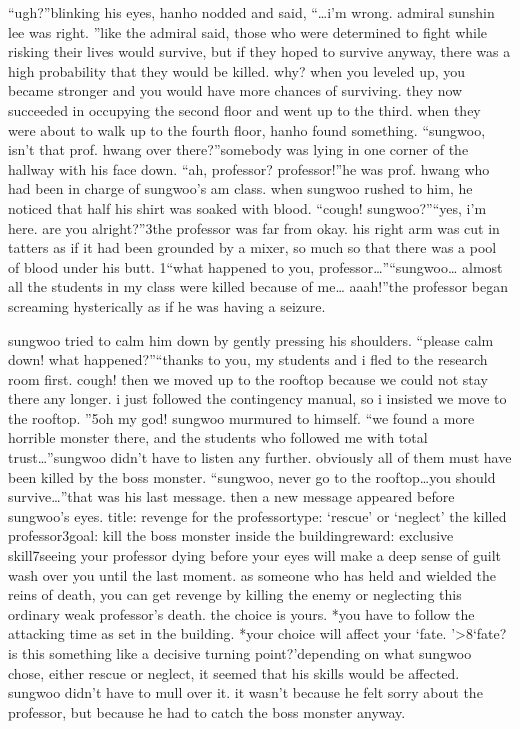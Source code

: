 “ugh?”blinking his eyes, hanho nodded and said, “…i’m wrong.
 admiral sunshin lee was right.
”like the admiral said, those who were determined to fight while risking their lives would survive, but if they hoped to survive anyway, there was a high probability that they would be killed.
why? when you leveled up, you became stronger and you would have more chances of surviving.
they now succeeded in occupying the second floor and went up to the third.
when they were about to walk up to the fourth floor, hanho found something.
“sungwoo, isn’t that prof.
 hwang over there?”somebody was lying in one corner of the hallway with his face down.
“ah, professor? professor!”he was prof.
 hwang who had been in charge of sungwoo’s am class.
 when sungwoo rushed to him, he noticed that half his shirt was soaked with blood.
“cough! sungwoo?”“yes, i’m here.
 are you alright?”3the professor was far from okay.
 his right arm was cut in tatters as if it had been grounded by a mixer, so much so that there was a pool of blood under his butt.
1“what happened to you, professor…”“sungwoo… almost all the students in my class were killed because of me… aaah!”the professor began screaming hysterically as if he was having a seizure.


sungwoo tried to calm him down by gently pressing his shoulders.
“please calm down! what happened?”“thanks to you, my students and i fled to the research room first.
 cough! then we moved up to the rooftop because we could not stay there any longer.
 i just followed the contingency manual, so i insisted we move to the rooftop.
”5oh my god! sungwoo murmured to himself.
“we found a more horrible monster there, and the students who followed me with total trust…”sungwoo didn’t have to listen any further.
 obviously all of them must have been killed by the boss monster.
“sungwoo, never go to the rooftop…you should survive…”that was his last message.
 then a new message appeared before sungwoo’s eyes.
title: revenge for the professortype: ‘rescue’ or ‘neglect’ the killed professor3goal: kill the boss monster inside the buildingreward: exclusive skill7seeing your professor dying before your eyes will make a deep sense of guilt wash over you until the last moment.
 as someone who has held and wielded the reins of death, you can get revenge by killing the enemy or neglecting this ordinary weak professor’s death.
 the choice is yours.
*you have to follow the attacking time as set in the building.
*your choice will affect your ‘fate.
’>8‘fate? is this something like a decisive turning point?’depending on what sungwoo chose, either rescue or neglect, it seemed that his skills would be affected.
sungwoo didn’t have to mull over it.
 it wasn’t because he felt sorry about the professor, but because he had to catch the boss monster anyway.


 